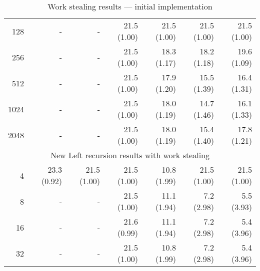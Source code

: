 \begin{table}
\begin{center}
\begin{tabular}{r|rr|rrrr}
128  &-&-& 21.5 (1.00) & 21.5 (1.00) & 21.5 (1.00) & 21.5 (1.00) \\
256  &-&-& 21.5 (1.00) & 18.3 (1.17) & 18.2 (1.18) & 19.6 (1.09) \\
512  &-&-& 21.5 (1.00) & 17.9 (1.20) & 15.5 (1.39) & 16.4 (1.31) \\
1024 &-&-& 21.5 (1.00) & 18.0 (1.19) & 14.7 (1.46) & 16.1 (1.33) \\
2048 &-&-& 21.5 (1.00) & 18.0 (1.19) & 15.4 (1.40) & 17.8 (1.21) \\
\hline
\hline
\multicolumn{7}{c}{New Left recursion results with work stealing} \\
\hline
4        & 23.3 (0.92) & 21.5 (1.00)
         & 21.5 (1.00) & 10.8 (1.99) & 21.5 (1.00) & 21.5 (1.00) \\
8    &-&-& 21.5 (1.00) & 11.1 (1.94) &  7.2 (2.98) &  5.5 (3.93) \\
16   &-&-& 21.6 (0.99) & 11.1 (1.94) &  7.2 (2.98) &  5.4 (3.96) \\
32   &-&-& 21.5 (1.00) & 10.8 (1.99) &  7.2 (2.98) &  5.4 (3.96) \\
\end{tabular}
\end{center}
\caption{Work stealing results --- initial implementation}
\label{tab:work_stealing_initial}
\end{table}

